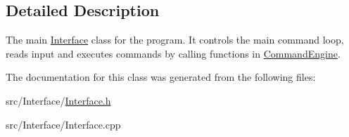 \subsection{Detailed Description}
The main \hyperlink{classInterface}{Interface} class for the program. It controls the main command loop, reads input and executes commands by calling functions in \hyperlink{classCommandEngine}{Command\+Engine}. 

The documentation for this class was generated from the following files\+:\begin{DoxyCompactItemize}
\item 
src/\+Interface/\hyperlink{Interface_8h}{Interface.\+h}\item 
src/\+Interface/Interface.\+cpp\end{DoxyCompactItemize}

